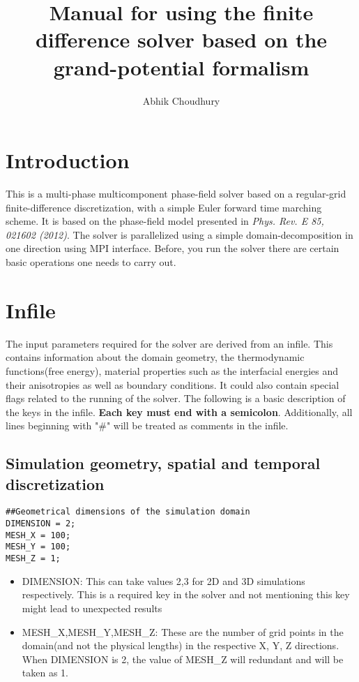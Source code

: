 \documentclass[a4paper,10pt]{article}
\title{Manual for using the finite difference solver based on the grand-potential formalism}
\author{Abhik Choudhury}
\begin{document}
\maketitle

\section{Introduction}
This is a multi-phase multicomponent phase-field solver based on a
regular-grid finite-difference discretization, with a
simple Euler forward time marching scheme. It is based on the 
phase-field model presented in \textit{Phys. Rev. E 85, 021602 (2012)}.
The solver is parallelized using a simple domain-decomposition in 
one direction using MPI interface. Before, you run the solver there
are certain basic operations one needs to carry out.

\section{Infile}
The input parameters required for the solver are derived from an 
infile. This contains information about the domain geometry, 
the thermodynamic functions(free energy), material properties 
such as the interfacial energies and their anisotropies 
as well as boundary conditions. It could also contain special
flags related to the running of the solver. The following is a basic 
description of the keys in the infile. \textbf{Each key must end with 
a semicolon}. Additionally, all lines beginning with "\#" will be treated
as comments in the infile.


\subsection{Simulation geometry, spatial and temporal discretization}

\begin{lstlisting}
##Geometrical dimensions of the simulation domain
DIMENSION = 2;
MESH_X = 100;
MESH_Y = 100;
MESH_Z = 1;
\end{lstlisting}

\begin{itemize}
\item DIMENSION: This can take values 2,3 for 2D and 3D simulations respectively. This is a required key in the solver and not mentioning this key might lead to unexpected results
\item MESH\_X,MESH\_Y,MESH\_Z: These are the number of grid points in the domain(and not the physical lengths) in the respective X, Y, Z directions. 
When DIMENSION is 2, the value of MESH\_Z will redundant and will be taken as 1.
\end{itemize}
\end{document}
